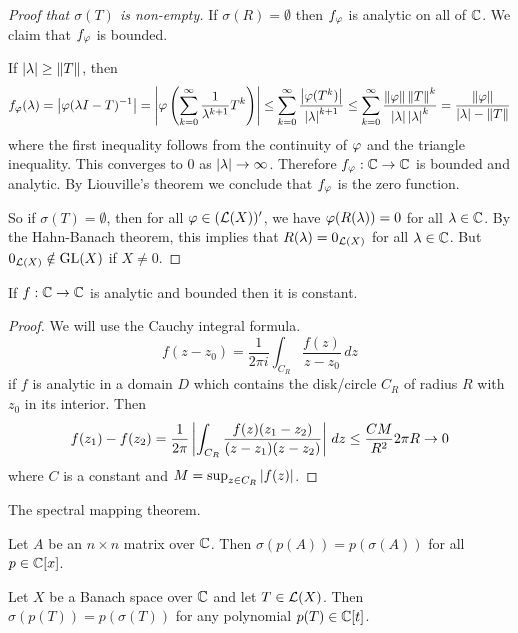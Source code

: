 \begin{proof}[Proof that $\sigma(T)$ is non-empty]
  If $\sigma(R) = \emptyset$ then $f_\varphi$ is analytic on all of $\mathbb{C}$.
  We claim that $f_\varphi$ is bounded.

  If $\left\lvert \lambda \right\rvert \geq \left\lVert T \right\rVert$, then
  \[ f_\varphi(\lambda) = \left\lvert \varphi(\lambda I-T)^{-1} \right\rvert = \left\lvert  \varphi\left( \sum_{k=0}^\infty \frac{1}{\lambda^{k+1}}T^k \right) \right\rvert \leq \sum_{k=0}^\infty \frac{\left\lvert \varphi(T^k) \right\rvert}{\left\lvert \lambda \right\rvert^{k+1}} \leq \sum_{k=0}^\infty \frac{\left\lVert \varphi \right\rVert \left\lVert T \right\rVert^k}{\left\lvert \lambda \right\rvert \left\lvert \lambda \right\rvert^k} = \frac{\left\lVert \varphi \right\rVert}{\left\lvert \lambda \right\rvert-\left\lVert T \right\rVert} \]
  where the first inequality follows from the continuity of $\varphi$ and the triangle inequality.
  This converges to 0 as $\left\lvert \lambda \right\rvert \to \infty$.
  Therefore $f_\varphi: \mathbb{C} \to \mathbb{C}$ is bounded and analytic.
  By Liouville's theorem we conclude that $f_\varphi$ is the zero function.

  So if $\sigma(T)=\emptyset$, then for all $\varphi \in (\mathcal{L}(X))'$, we have $\varphi(R(\lambda))=0$ for all $\lambda \in \mathbb{C}$.
  By the Hahn-Banach theorem, this implies that $R(\lambda) = 0_{\mathcal{L}(X)}$ for all $\lambda \in \mathbb{C}$.
  But $0_{\mathcal{L}(X)} \notin \operatorname{GL}(X)$ if $X \neq 0$.
\end{proof}

\begin{thm}
  If $f: \mathbb{C} \to \mathbb{C}$ is analytic and bounded then it is constant.
\end{thm}

\begin{proof}
  We will use the Cauchy integral formula.
  \[ f(z-z_0) = \frac{1}{2\pi i} \int_{C_R} \frac{f(z)}{z-z_0} \, dz \]
  if $f$ is analytic in a domain $D$ which contains the disk/circle $C_R$ of radius $R$ with $z_0$ in its interior.
  Then
  \[ f(z_1)-f(z_2) = \frac{1}{2\pi} \left\lvert  \int_{C_R} \frac{f(z)(z_1-z_2)}{(z-z_1)(z-z_2)}  \right\rvert \, dz \leq \frac{CM}{R^2}2\pi R \to 0 \]
  where $C$ is a constant and $M = \sup_{z \in C_R} \left\lvert f(z) \right\rvert$.
\end{proof}

The spectral mapping theorem.

Let $A$ be an $n \times n$ matrix over $\mathbb{C}$.
Then $\sigma(p(A))=p(\sigma(A))$ for all $p \in \mathbb{C}[x]$.

\begin{thm}
  Let $X$ be a Banach space over $\mathbb{C}$ and let $T \in \mathcal{L}(X)$.
  Then $\sigma(p(T))=p(\sigma(T))$ for any polynomial $p(T) \in \mathbb{C}[t]$.
\end{thm}

